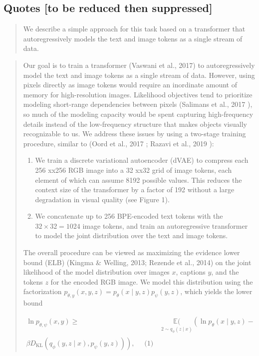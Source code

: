 \documentclass{article}
\begin{document}
\begin{appendix}
\subsection{Quotes [to be reduced then suppressed]}

\blockquote{We describe a simple approach for this task based on a transformer that autoregressively models the text and image tokens as a single stream of data.}

\blockquote{
Our goal is to train a transformer (Vaswani et al., 2017) to autoregressively model the text and image tokens as a single stream of data. However, using pixels directly as image tokens would require an inordinate amount of memory for high-resolution images.
Likelihood objectives tend to prioritize modeling short-range dependencies between pixels (Salimans et al., 2017 ), so much of the modeling capacity would be spent capturing high-frequency details instead of the low-frequency structure that makes objects visually recognizable to us.
We address these issues by using a two-stage training procedure, similar to (Oord et al., 2017 ; Razavi et al., 2019 ):
\begin{enumerate}
    \item We train a discrete variational autoencoder (dVAE) to compress each 256 xx256 RGB image into a 32 xx32 grid of image tokens, each element of which can assume 8192 possible values.
    This reduces the context size of the transformer by a factor of 192 without a large degradation in visual quality (see Figure 1).
    \item We concatenate up to 256 BPE-encoded text tokens with the $32 \times 32=1024$ image tokens, and train an autoregressive transformer to model the joint distribution over the text and image tokens.
\end{enumerate}

The overall procedure can be viewed as maximizing the evidence lower bound (ELB) (Kingma \& Welling, 2013; Rezende et al., 2014) on the joint likelihood of the model distribution over images $x$, captions $y$, and the tokens $z$ for the encoded RGB image.
We model this distribution using the factorization $p_{\theta, y}(x, y, z)=p_{\theta}(x \mid y, z) p_{\psi}(y, z)$, which yields the lower bound

$\begin{aligned}
\ln p_{\theta, \psi}(x, y) \geqslant & \underset{2 \sim q_{\phi}(z \mid x)}{\mathbb{E}(}\left(\ln p_{\theta}(x \mid y, z)-\right.\\
\left.\beta D_{\mathrm{KL}}\left(q_{\phi}(y, z \mid x), p_{\psi}(y, z)\right)\right), \quad \text { (1) } \end{aligned}$

}
\end{appendix}
\end{document}
